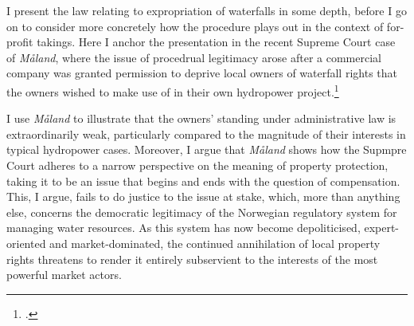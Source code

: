 I present the law relating to expropriation of waterfalls in some depth, before I go on to consider more concretely how the procedure plays out in the context of for-profit takings. Here I anchor the presentation in the recent Supreme Court case of {\it Måland}, where the issue of procedrual legitimacy arose after a commercial company was granted permission to deprive local owners of waterfall rights that the owners wished to make use of in their own hydropower project.\footcite{jorpeland11}

I use {\it Måland} to illustrate that the owners' standing under administrative law is extraordinarily weak, particularly compared to the magnitude of their interests in typical hydropower cases. Moreover, I argue that {\it Måland} shows how the Supmpre Court adheres to a narrow perspective on the meaning of property protection, taking it to be an issue that begins and ends with the question of compensation. This, I argue, fails to do justice to the issue at stake, which, more than anything else, concerns the democratic legitimacy of the Norwegian regulatory system for managing water resources. As this system has now become depoliticised, expert-oriented and market-dominated, the continued annihilation of local property rights threatens to render it entirely subservient to the interests of the most powerful market actors.
%
%
%
%
%
